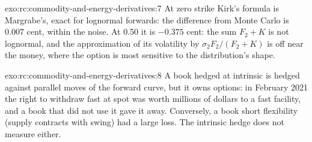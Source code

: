 \begin{solution}{exo:rc:commodity-and-energy-derivatives:7}
At zero strike Kirk's formula is Margrabe's, exact for lognormal forwards: the difference
from Monte Carlo is 0.007 cent, within the noise. At 0.50 it is $-0.375$ cent: the sum
$F_2+K$ is not lognormal, and the approximation of its volatility by $\sigma_2F_2/(F_2+K)$ is
off near the money, where the option is most sensitive to the distribution's shape.
\end{solution}

\begin{solution}{exo:rc:commodity-and-energy-derivatives:8}
A book hedged at intrinsic is hedged against parallel moves of the forward curve, but it
owns options: in February 2021 the right to withdraw fast at spot was worth millions of
dollars to a fast facility, and a book that did not use it gave it away. Conversely, a
book short flexibility (supply contracts with swing) had a large loss. The intrinsic hedge
does not measure either.
\end{solution}

